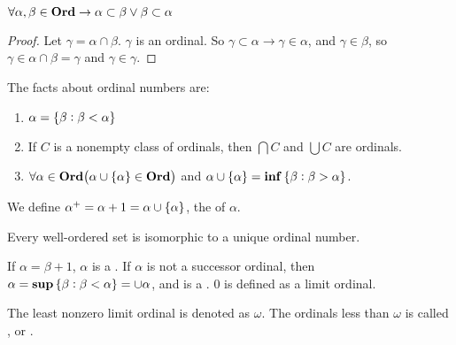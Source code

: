 \begin{theorem} 
    $\forall \alpha, \beta \in \mathbf{Ord} \rightarrow \alpha \subset \beta \vee \beta \subset \alpha$
\end{theorem}
\begin{proof}
    Let $\gamma = \alpha \cap \beta$. $\gamma$ is an ordinal. So $\gamma \subset \alpha \rightarrow \gamma \in \alpha$, and $\gamma \in \beta$, so $\gamma \in \alpha \cap \beta = \gamma$ and $\gamma \in \gamma$.
\end{proof}

\begin{theorem}
    The facts about ordinal numbers are:
    \begin{enumerate}
        \item $\alpha = \set{\beta: \beta < \alpha}$
        \item If $C$ is a nonempty class of ordinals, then $\bigcap C$ and $\bigcup C$ are ordinals.
        \item $\forall \alpha \in \allordinals \mleft(\alpha \cup \set{\alpha} \in \allordinals \mright)$ and $\alpha \cup \set{\alpha} = \mathbf{inf} \set{\beta: \beta > \alpha}$.
    \end{enumerate}    
\end{theorem}

\begin{definition}
    We define $\alpha^{+} =  \alpha + 1 = \alpha \cup \set{\alpha}$, the  of $\alpha$.
\end{definition}


\begin{theorem}
    Every well-ordered set is isomorphic to a unique ordinal number.    
\end{theorem}

\begin{definition}
    If $\alpha = \beta + 1$, $\alpha$ is a . If $\alpha$ is not a successor ordinal, then $\alpha = \mathbf{sup} \set{\beta: \beta < \alpha} = \cup \alpha$, and is a . $0$ is defined as a limit ordinal.
\end{definition}


\begin{definition}
    The least nonzero limit ordinal is denoted as $\omega$. The ordinals less than $\omega$ is called , or .
\end{definition}

